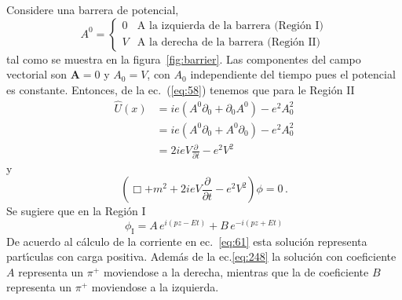 Considere una barrera de potencial,
\begin{equation}
  A^0=\begin{cases}
    0&\text{A la izquierda de la barrera (Regi\'on I)}\\
    V&\text{A la derecha de la barrera (Regi\'on II)}
  \end{cases}
\end{equation} 
tal como se muestra en la figura~\ref{fig:barrier}.
Las componentes del campo vectorial son $\mathbf{A}=0$ y $A_0=V$, con $A_0$ independiente del tiempo pues el potencial es constante. Entonces, de la ec.~(\ref{eq:58}) tenemos que para le Regi\'on II
\begin{align}
  \hat{U}(x)&=ie(A^0\partial_0+\partial_0 A^0)-e^2A_0^2\nonumber\\
  &=ie(A^0\partial_0+A^0\partial_0 )-e^2A_0^2\nonumber\\
&=2ieV\frac{\partial}{\partial t}-e^2V^2
\end{align}
y
\begin{equation}
  \label{eq:59}
  (\Box +m^2+2ieV\frac{\partial}{\partial t}-e^2V^2)\phi=0\,.
\end{equation}
Se sugiere que en la Regi\'on I
\begin{equation}
  \phi_{\text{I}}=A\,e^{i(pz-Et)}+B\,e^{-i(pz+Et)}
\end{equation}
De acuerdo al c\'alculo de la corriente en ec.~\eqref{eq:61} esta soluci\'on representa part\'\i culas con carga positiva. Adem\'as de la ec.\eqref{eq:248} la soluci\'on con coeficiente $A$ representa un $\pi^+$ moviendose a la derecha, mientras que la de coeficiente $B$ representa un $\pi^+$ moviendose a la izquierda.

